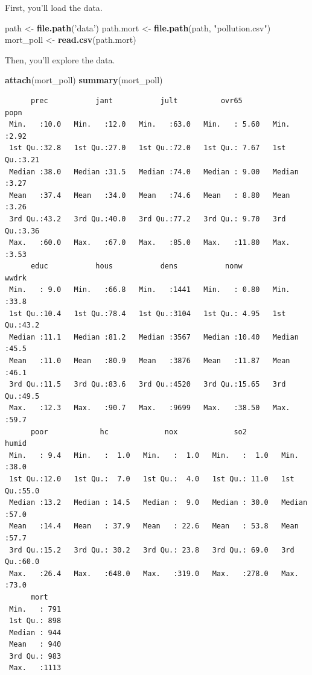 \documentclass[
]{book}
\newenvironment{Shaded}{\begin{snugshade}}{\end{snugshade}}
\newcommand{\KeywordTok}[1]{\textcolor[rgb]{0.13,0.29,0.53}{\textbf{#1}}}
\newcommand{\NormalTok}[1]{#1}
\newcommand{\StringTok}[1]{\textcolor[rgb]{0.31,0.60,0.02}{#1}}
\begin{document}
First, you'll load the data.

\begin{Shaded}
\begin{Highlighting}[]
\NormalTok{path <-}\StringTok{ }\KeywordTok{file.path}\NormalTok{(}\StringTok{'data'}\NormalTok{)}
\NormalTok{path.mort <-}\StringTok{ }\KeywordTok{file.path}\NormalTok{(path, }\StringTok{"pollution.csv"}\NormalTok{)}
\NormalTok{mort_poll <-}\StringTok{ }\KeywordTok{read.csv}\NormalTok{(path.mort)}
\end{Highlighting}
\end{Shaded}

Then, you'll explore the data.

\begin{Shaded}
\begin{Highlighting}[]
\KeywordTok{attach}\NormalTok{(mort_poll)}
\KeywordTok{summary}\NormalTok{(mort_poll)}
\end{Highlighting}
\end{Shaded}

\begin{verbatim}
      prec           jant           jult          ovr65            popn     
 Min.   :10.0   Min.   :12.0   Min.   :63.0   Min.   : 5.60   Min.   :2.92  
 1st Qu.:32.8   1st Qu.:27.0   1st Qu.:72.0   1st Qu.: 7.67   1st Qu.:3.21  
 Median :38.0   Median :31.5   Median :74.0   Median : 9.00   Median :3.27  
 Mean   :37.4   Mean   :34.0   Mean   :74.6   Mean   : 8.80   Mean   :3.26  
 3rd Qu.:43.2   3rd Qu.:40.0   3rd Qu.:77.2   3rd Qu.: 9.70   3rd Qu.:3.36  
 Max.   :60.0   Max.   :67.0   Max.   :85.0   Max.   :11.80   Max.   :3.53  
      educ           hous           dens           nonw           wwdrk     
 Min.   : 9.0   Min.   :66.8   Min.   :1441   Min.   : 0.80   Min.   :33.8  
 1st Qu.:10.4   1st Qu.:78.4   1st Qu.:3104   1st Qu.: 4.95   1st Qu.:43.2  
 Median :11.1   Median :81.2   Median :3567   Median :10.40   Median :45.5  
 Mean   :11.0   Mean   :80.9   Mean   :3876   Mean   :11.87   Mean   :46.1  
 3rd Qu.:11.5   3rd Qu.:83.6   3rd Qu.:4520   3rd Qu.:15.65   3rd Qu.:49.5  
 Max.   :12.3   Max.   :90.7   Max.   :9699   Max.   :38.50   Max.   :59.7  
      poor            hc             nox             so2            humid     
 Min.   : 9.4   Min.   :  1.0   Min.   :  1.0   Min.   :  1.0   Min.   :38.0  
 1st Qu.:12.0   1st Qu.:  7.0   1st Qu.:  4.0   1st Qu.: 11.0   1st Qu.:55.0  
 Median :13.2   Median : 14.5   Median :  9.0   Median : 30.0   Median :57.0  
 Mean   :14.4   Mean   : 37.9   Mean   : 22.6   Mean   : 53.8   Mean   :57.7  
 3rd Qu.:15.2   3rd Qu.: 30.2   3rd Qu.: 23.8   3rd Qu.: 69.0   3rd Qu.:60.0  
 Max.   :26.4   Max.   :648.0   Max.   :319.0   Max.   :278.0   Max.   :73.0  
      mort     
 Min.   : 791  
 1st Qu.: 898  
 Median : 944  
 Mean   : 940  
 3rd Qu.: 983  
 Max.   :1113  
\end{verbatim}
\end{document}
